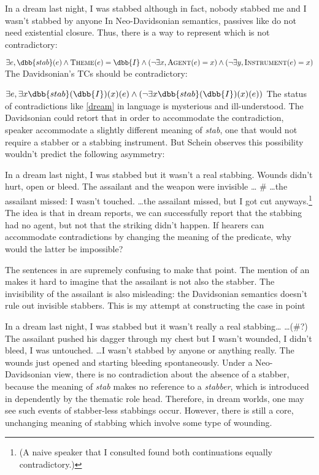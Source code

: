 \ex\label{dream}
In a dream last night, I was stabbed although in fact, nobody stabbed me and I wasn't stabbed by anyone
\xe
%
In Neo-Davidsonian semantics, passives like  do not need existential closure. Thus, there is a way to represent \clastx which is not contradictory:

\ex
$\exists e, \dbb{stab}(e) \wedge \textsc{Theme}(e) = \dbb{I} \wedge\left(\neg\exists x, \textsc{Agent}(e) = x\right) \wedge \left(\neg\exists y, \textsc{Instrument}(e) = x\right)$
\xe
%
The Davidsonian's TCs should be contradictory:

\ex
$\exists e, \exists x\dbb{stab}(\dbb{I})(x)(e) \wedge 
 \left(\neg\exists x\dbb{stab}(\dbb{I})(x)(e)\right)$
\xe
%
The status of contradictions like \cref{dream} in language is mysterious and ill-understood. The Davidsonian could retort that in order to accommodate the contradiction, speaker accommodate a slightly different meaning of \emph{stab}, one that would not require a stabber or a stabbing instrument. But Schein observes this possibility wouldn't predict the following asymmetry:

\pex
In a dream last night, I was stabbed but it wasn't a real stabbing.
Wounds didn't hurt, open or bleed.
The assailant and the weapon were invisible \ldots
\a\ljudge\# \ldots the assailant missed: I wasn't touched.
\a \ldots the assailant missed, but I got cut anyways.\footnote{
(A naive speaker that I consulted found both continuations equally contradictory.)
}
\xe
%
The idea is that in dream reports, we can successfully report that the stabbing had no agent, but not that the striking didn't happen. 
If hearers can accommodate contradictions by changing the meaning of the predicate, why would the latter be impossible?

The sentences in \clastx are supremely confusing to make that point. The mention of an  makes it hard to imagine that the assailant is not also the stabber. The invisibility of the assailant is also misleading: the Davidsonian semantics doesn't rule out invisible stabbers. This is my attempt at constructing the case in point

\pex
In a dream last night, I was stabbed but it wasn't really a real stabbing\ldots
\a 
\ldots(\#?) The assailant pushed his dagger through my chest but I wasn't wounded, I didn't bleed, I was untouched.
\a 
\ldots I wasn't stabbed by anyone or anything really. The wounds just opened and starting bleeding spontaneously.
\xe
%
Under a Neo-Davidsonian view, there is no contradiction about the absence of a stabber, because the meaning of \emph{stab} makes no reference to 	a \emph{stabber}, which is introduced in dependently by the thematic role head. Therefore, in dream worlds, one may see such events of stabber-less stabbings occur. However, there is still a core, unchanging meaning of stabbing which involve some type of wounding.

